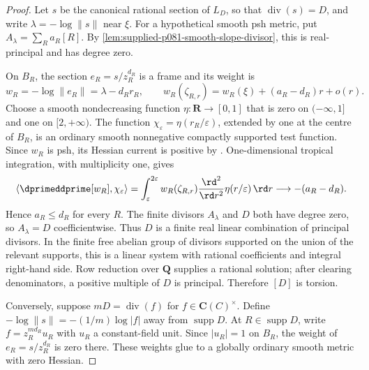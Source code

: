 \begin{proof}
Let $s$ be the canonical rational section of $L_D$, so that
$\operatorname{div}(s)=D$, and write $\lambda=-\log\|s\|$ near $\xi$.
For a hypothetical smooth psh metric, put
$A_\lambda=\sum_Ra_R[R]$.  By
\cref{lem:supplied-p081-smooth-slope-divisor}, this is real-principal and
has degree zero.

On $B_R$, the section $e_R=s/z_R^{d_R}$ is a frame and its weight is
\[
 w_R=-\log\|e_R\|=\lambda-d_Rr_R,
 \qquad
 w_R(\zeta_{R,r})=w_R(\xi)+(a_R-d_R)r+o(r).
\]
Choose a smooth nondecreasing function $\eta\colon\mathbf R\to[0,1]$ that
is zero on $(-\infty,1]$ and one on $[2,+\infty)$.  The function
$\chi_\varepsilon=\eta(r_R/\varepsilon)$, extended by one at the centre of
$B_R$, is an ordinary smooth nonnegative compactly supported test function.
Since $w_R$ is psh, its Hessian current is positive by
\cite[Proposition~8.3.1(a) and Theorem~15.7.1]{CLD25}.  One-dimensional
tropical integration, with multiplicity one, gives
\[
 \left\langle\dprimeddprime[w_R],\chi_\varepsilon\right\rangle
 =\int_\varepsilon^{2\varepsilon}
     w_R(\zeta_{R,r})\frac{\rd^2}{\rd r^2}
          \eta(r/\varepsilon)\,\rd r
 \longrightarrow -(a_R-d_R).
\]
Hence $a_R\leq d_R$ for every $R$.  The finite divisors $A_\lambda$ and
$D$ both have degree zero, so $A_\lambda=D$ coefficientwise.  Thus $D$ is
a finite real linear combination of principal divisors.  In the finite
free abelian group of divisors supported on the union of the relevant
supports, this is a linear system with rational coefficients and integral
right-hand side.  Row reduction over $\mathbf Q$ supplies a rational
solution; after clearing denominators, a positive multiple of $D$ is
principal.  Therefore $[D]$ is torsion.

Conversely, suppose $mD=\operatorname{div}(f)$ for
$f\in\mathbf C(C)^\times$.  Define
$-\log\|s\|=-(1/m)\log|f|$ away from $\operatorname{supp}D$.  At
$R\in\operatorname{supp}D$, write
$f=z_R^{md_R}u_R$ with $u_R$ a constant-field unit.  Since $|u_R|=1$ on
$B_R$, the weight of $e_R=s/z_R^{d_R}$ is zero there.  These weights glue
to a globally ordinary smooth metric with zero Hessian.
\end{proof}

